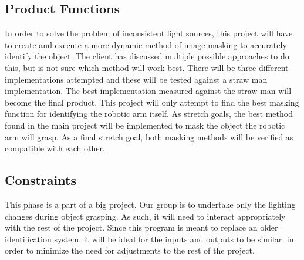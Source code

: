 \documentclass[10pt,journal,compsoc, draftclsnofoot,onecolumn]{IEEEtran}
\begin{document}
\subsection{Product Functions}

In order to solve the problem of inconsistent light sources, this project will have to create and execute a more dynamic method of image masking to accurately identify the object.
The client has discussed multiple possible approaches to do this, but is not sure which method will work best.
There will be three different implementations attempted and these will be tested against a straw man implementation.
The best implementation measured against the straw man will become the final product.
This project will only attempt to find the best masking function for identifying the robotic arm itself.
As stretch goals, the best method found in the main project will be implemented to mask the object the robotic arm will grasp.
As a final stretch goal, both masking methods will be verified as compatible with each other.




\subsection{Constraints}
This phase is a part of a big project.
Our group is to undertake only the lighting changes during object grasping.
As such, it will need to interact appropriately with the rest of the project.
Since this program is meant to replace an older identification system, it will be ideal for the inputs and outputs to be similar, in order to minimize the need for adjustments to the rest of the project.
\end{document}
